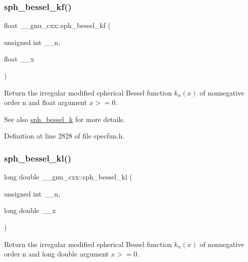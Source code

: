 \subsubsection{\texorpdfstring{sph\+\_\+bessel\+\_\+kf()}{sph\_bessel\_kf()}}
{\footnotesize\ttfamily float \+\_\+\+\_\+gnu\+\_\+cxx\+::sph\+\_\+bessel\+\_\+kf (\begin{DoxyParamCaption}\item[{unsigned int}]{\+\_\+\+\_\+n,  }\item[{float}]{\+\_\+\+\_\+x }\end{DoxyParamCaption})\hspace{0.3cm}{\ttfamily [inline]}}

Return the irregular modified spherical Bessel function $ k_n(x) $ of nonnegative order n and {\ttfamily float} argument $ x >= 0 $.

\begin{DoxySeeAlso}{See also}
\hyperlink{group__gnu__math__spec__func_ga288b28f2c6995d052a4f5f17293cbf1a}{sph\+\_\+bessel\+\_\+k} for more details. 
\end{DoxySeeAlso}


Definition at line 2828 of file specfun.\+h.

\mbox{\label{group__gnu__math__spec__func_ga22f6a73e50e7020a7c2fa64ce1b9be41}} 
\subsubsection{\texorpdfstring{sph\+\_\+bessel\+\_\+kl()}{sph\_bessel\_kl()}}
{\footnotesize\ttfamily long double \+\_\+\+\_\+gnu\+\_\+cxx\+::sph\+\_\+bessel\+\_\+kl (\begin{DoxyParamCaption}\item[{unsigned int}]{\+\_\+\+\_\+n,  }\item[{long double}]{\+\_\+\+\_\+x }\end{DoxyParamCaption})\hspace{0.3cm}{\ttfamily [inline]}}

Return the irregular modified spherical Bessel function $ k_n(x) $ of nonnegative order n and {\ttfamily long double} argument $ x >= 0 $.

